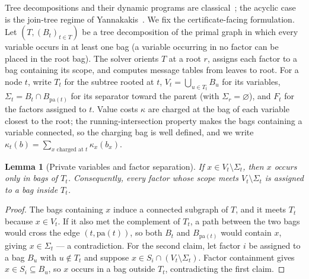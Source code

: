 \documentclass[11pt]{article}
\theoremstyle{plain}
\newtheorem{lemma}[theorem]{Lemma}
\theoremstyle{definition}
\theoremstyle{remark}
\begin{document}
Tree decompositions and their dynamic programs are
classical~\cite{robertson-seymour84,bodlaender93,bodlaender-koster08,arnborg-proskurowski89,dechter03};
the acyclic case is the join-tree regime of Yannakakis~\cite{yannakakis81}.
We fix the certificate-facing formulation.  Let \((T,(B_t)_{t\in T})\) be a
tree decomposition of the primal graph in which every variable occurs in at
least one bag (a variable occurring in no factor can be placed in the root
bag).  The solver orients \(T\) at a root \(r\), assigns each factor to a bag
containing its scope, and computes message tables from leaves to root.  For a
node \(t\), write \(T_t\) for the subtree rooted at \(t\),
\(V_t=\bigcup_{u\in T_t}B_u\) for its variables,
\(\Sigma_t=B_t\cap B_{\mathrm{pa}(t)}\) for its separator toward the parent
(with \(\Sigma_r=\varnothing\)), and \(F_t\) for the factors assigned to
\(t\).  Value costs \(\kappa\) are charged at the bag of each variable
closest to the root; the running-intersection property makes the bags
containing a variable connected, so the charging bag is well defined, and we
write \(\kappa_t(b)=\sum_{x\text{ charged at }t}\kappa_x(b_x)\).

\begin{lemma}[Private variables and factor separation]
\label{lem:private-variables}
If \(x\in V_t\setminus\Sigma_t\), then \(x\) occurs only in bags of \(T_t\).
Consequently, every factor whose scope meets \(V_t\setminus\Sigma_t\) is
assigned to a bag inside \(T_t\).
\end{lemma}

\begin{proof}
The bags containing \(x\) induce a connected subgraph of \(T\), and it
meets \(T_t\) because \(x\in V_t\).  If it also met the complement of
\(T_t\), a path between the two bags would cross the edge
\((t,\mathrm{pa}(t))\), so both \(B_t\) and \(B_{\mathrm{pa}(t)}\) would
contain \(x\), giving \(x\in\Sigma_t\) --- a contradiction.  For the second
claim, let factor \(i\) be assigned to a bag \(B_u\) with \(u\notin T_t\)
and suppose \(x\in S_i\cap(V_t\setminus\Sigma_t)\).  Factor containment
gives \(x\in S_i\subseteq B_u\), so \(x\) occurs in a bag outside \(T_t\),
contradicting the first claim.
\end{proof}
\end{document}
